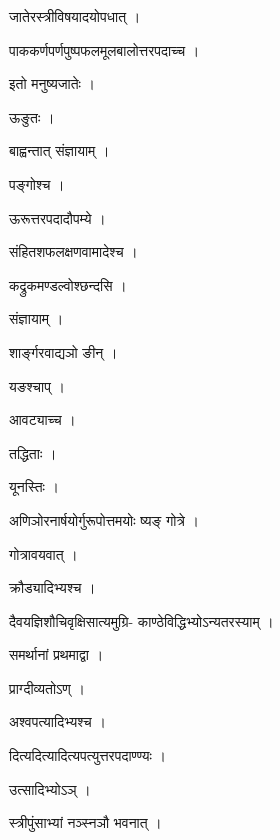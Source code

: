 \documentclass[10pt, openany]{book}
\begin{document}
\noindent जातेरस्त्रीविषयादयोपधात् ।

\noindent पाककर्णपर्णपुष्पफलमूलबालोत्तरपदाच्च ।

\noindent इतो मनुष्यजातेः ।

\noindent ऊङुतः ।

\noindent बाह्वन्तात् संज्ञायाम् ।

\noindent पङ्गोश्च ।

\noindent ऊरूत्तरपदादौपम्ये ।

\noindent संहितशफलक्षणवामादेश्च ।

\noindent कद्रुकमण्डल्वोश्छन्दसि ।

\noindent संज्ञायाम् ।

\noindent शार्ङ्गरवाद्यञो ङीन् ।

\noindent यङश्चाप् ।

\noindent आवट्याच्च ।

\noindent तद्धिताः ।

\noindent यूनस्तिः ।

\noindent अणिञोरनार्षयोर्गुरूपोत्तमयोः ष्यङ् गोत्रे ।

\noindent गोत्रावयवात् ।

\noindent क्रौड्यादिभ्यश्च ।

\noindent दैवयज्ञिशौचिवृक्षिसात्यमुग्रि- काण्ठेविद्धिभ्योऽन्यतरस्याम् ।

\noindent समर्थानां प्रथमाद्वा ।

\noindent प्राग्दीव्यतोऽण् ।

\noindent अश्वपत्यादिभ्यश्च ।

\noindent दित्यदित्यादित्यपत्युत्तरपदाण्ण्यः ।

\noindent उत्सादिभ्योऽञ् ।

\noindent स्त्रीपुंसाभ्यां नञ्स्नञौ भवनात् ।
\end{document}
